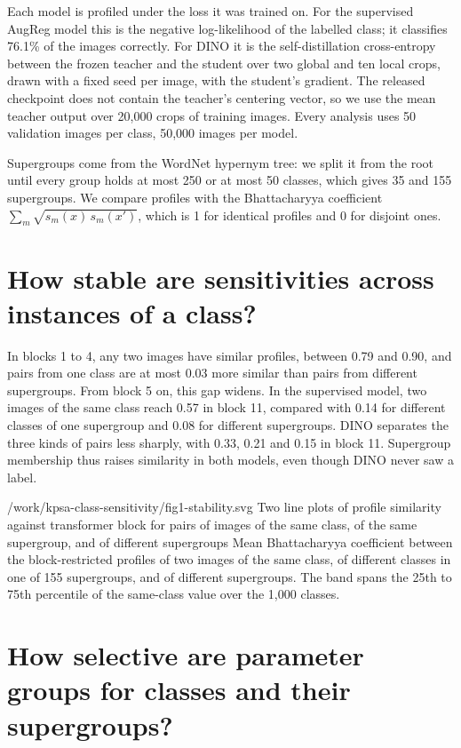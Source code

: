 \documentclass[11pt]{article}
\begin{document}
Each model is profiled under the loss it was trained on. For the supervised AugReg model this is the negative log-likelihood of the labelled class; it classifies 76.1\% of the images correctly. For DINO it is the self-distillation cross-entropy between the frozen teacher and the student over two global and ten local crops, drawn with a fixed seed per image, with the student's gradient. The released checkpoint does not contain the teacher's centering vector, so we use the mean teacher output over 20,000 crops of training images. Every analysis uses 50 validation images per class, 50,000 images per model.

Supergroups come from the WordNet hypernym tree: we split it from the root until every group holds at most 250 or at most 50 classes, which gives 35 and 155 supergroups. We compare profiles with the Bhattacharyya coefficient \(\sum_m \sqrt{s_m(x)\,s_m(x')}\), which is 1 for identical profiles and 0 for disjoint ones.

\section{How stable are sensitivities across instances of a class?}\label{stability}

In blocks 1 to 4, any two images have similar profiles, between 0.79 and 0.90, and pairs from one class are at most 0.03 more similar than pairs from different supergroups. From block 5 on, this gap widens. In the supervised model, two images of the same class reach 0.57 in block 11, compared with 0.14 for different classes of one supergroup and 0.08 for different supergroups. DINO separates the three kinds of pairs less sharply, with 0.33, 0.21 and 0.15 in block 11. Supergroup membership thus raises similarity in both models, even though DINO never saw a label.

  {/work/kpsa-class-sensitivity/fig1-stability.svg}
  {Two line plots of profile similarity against transformer block for pairs of images of the same class, of the same supergroup, and of different supergroups}
  {Mean Bhattacharyya coefficient between the block-restricted profiles of two images of the same class, of different classes in one of 155 supergroups, and of different supergroups. The band spans the 25th to 75th percentile of the same-class value over the 1,000 classes.}

\section{How selective are parameter groups for classes and their supergroups?}\label{selectivity}
\end{document}
